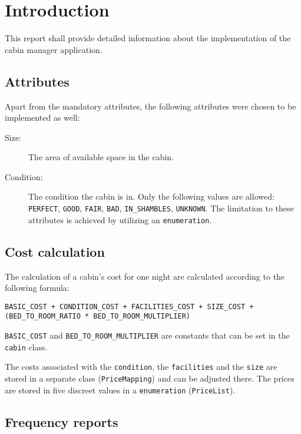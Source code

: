 \chapter{Introduction}\label{ch:introduction}

This report shall provide detailed information about the implementation of the cabin manager application.

\section{Attributes}
\label{sec:attributes}

Apart from the mandatory attributes, the following attributes were chosen to be implemented as well:
\begin{description}
\item[Size:] The area of available space in the cabin.
\item[Condition:] The condition the cabin is in. Only the following values are allowed: \texttt{PERFECT}, \texttt{GOOD}, \texttt{FAIR}, \texttt{BAD}, \texttt{IN\_SHAMBLES}, \texttt{UNKNOWN}. The limitation to these attributes is achieved by utilizing an \texttt{enumeration}.
\end{description}

\section{Cost calculation}
\label{sec:cost_calculation}

The calculation of a cabin's cost for one night are calculated according to the following formula:

\texttt{BASIC\_COST + CONDITION\_COST + FACILITIES\_COST + SIZE\_COST + (BED\_TO\_ROOM\_RATIO * BED\_TO\_ROOM\_MULTIPLIER)}

\texttt{BASIC\_COST} and \texttt{BED\_TO\_ROOM\_MULTIPLIER} are constants that can be set in the \texttt{cabin} class.

The costs associated with the \texttt{condition}, the \texttt{facilities} and the \texttt{size} are stored in a separate class (\texttt{PriceMapping}) and can be adjusted there.
The prices are stored in five discreet values in a \texttt{enumeration} (\texttt{PriceList}).

\section{Frequency reports}
\label{sec:frequency_report}

